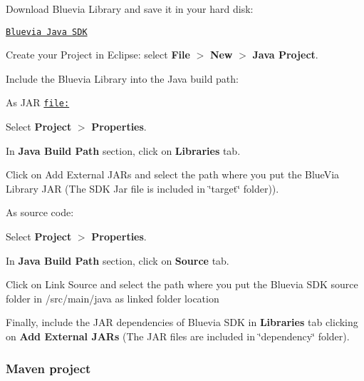 \begin{DoxyEnumerate}
\item Download Bluevia Library and save it in your hard disk:

\href{http://bluevia.com/#}{\tt Bluevia Java SDK}


\item Create your Project in Eclipse: select {\bfseries File} $>$ {\bfseries New} $>$ {\bfseries Java Project}.


\item Include the Bluevia Library into the Java build path: 
\begin{DoxyItemize}
\item As JAR \href{file:}{\tt file:} 
\begin{DoxyEnumerate}
\item Select {\bfseries Project} $>$ {\bfseries Properties}. 
\item In {\bfseries Java Build Path} section, click on {\bfseries Libraries} tab. 
\item Click on Add External JARs and select the path where you put the BlueVia Library JAR (The SDK Jar file is included in \char`\"{}target\char`\"{} folder)). 
\end{DoxyEnumerate}
\item As source code: 
\begin{DoxyEnumerate}
\item Select {\bfseries Project} $>$ {\bfseries Properties}. 
\item In {\bfseries Java Build Path} section, click on {\bfseries Source} tab. 
\item Click on Link Source and select the path where you put the Bluevia SDK source folder in /src/main/java as linked folder location 
\end{DoxyEnumerate}
\end{DoxyItemize}
\item Finally, include the JAR dependencies of Bluevia SDK in {\bfseries Libraries} tab clicking on {\bfseries Add External JARs} (The JAR files are included in \char`\"{}dependency\char`\"{} folder). 
\end{DoxyEnumerate}\hypertarget{main_getting_started_library_sec_maven}{}\subsubsection{Maven project}\label{main_getting_started_library_sec_maven}

